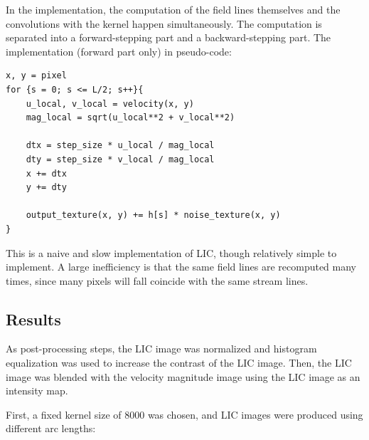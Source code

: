 \documentclass{article}
\begin{document}
\newpage

In the implementation, the computation of the field lines themselves and the convolutions with the kernel happen simultaneously.
The computation is separated into a forward-stepping part and a backward-stepping part.
The implementation (forward part only) in pseudo-code:
\begin{verbatim}
x, y = pixel
for {s = 0; s <= L/2; s++}{
    u_local, v_local = velocity(x, y)
    mag_local = sqrt(u_local**2 + v_local**2) 

    dtx = step_size * u_local / mag_local
    dty = step_size * v_local / mag_local
    x += dtx
    y += dty

    output_texture(x, y) += h[s] * noise_texture(x, y)
}

\end{verbatim}
This is a naive and slow implementation of LIC, though relatively simple to implement.
A large inefficiency is that the same field lines are recomputed many times, since many pixels will 
fall coincide with the same stream lines.

\subsection{Results}
As post-processing steps, the LIC image was normalized and histogram equalization was used to increase
the contrast of the LIC image. Then, the LIC image was blended with the velocity magnitude image using the 
LIC image as an intensity map.

First, a fixed kernel size of 8000 was chosen, and LIC images
were produced using different arc lengths:
\end{document}
